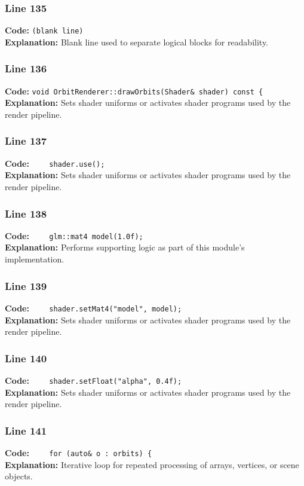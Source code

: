 \documentclass[11pt,a4paper]{article}
\begin{document}
\subsubsection*{Line 135}
\textbf{Code:} \texttt{(blank line)}\\
\textbf{Explanation:} Blank line used to separate logical blocks for readability.

\subsubsection*{Line 136}
\textbf{Code:} \verb|void OrbitRenderer::drawOrbits(Shader& shader) const {|\\
\textbf{Explanation:} Sets shader uniforms or activates shader programs used by the render pipeline.

\subsubsection*{Line 137}
\textbf{Code:} \verb|    shader.use();|\\
\textbf{Explanation:} Sets shader uniforms or activates shader programs used by the render pipeline.

\subsubsection*{Line 138}
\textbf{Code:} \verb|    glm::mat4 model(1.0f);|\\
\textbf{Explanation:} Performs supporting logic as part of this module's implementation.

\subsubsection*{Line 139}
\textbf{Code:} \verb|    shader.setMat4("model", model);|\\
\textbf{Explanation:} Sets shader uniforms or activates shader programs used by the render pipeline.

\subsubsection*{Line 140}
\textbf{Code:} \verb|    shader.setFloat("alpha", 0.4f);|\\
\textbf{Explanation:} Sets shader uniforms or activates shader programs used by the render pipeline.

\subsubsection*{Line 141}
\textbf{Code:} \verb|    for (auto& o : orbits) {|\\
\textbf{Explanation:} Iterative loop for repeated processing of arrays, vertices, or scene objects.
\end{document}

